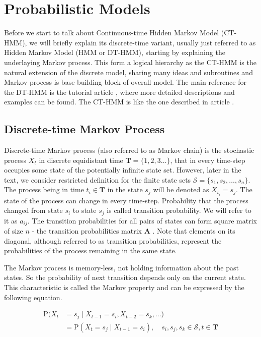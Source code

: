 \documentclass[thesis=M,english]{FITthesis}[2012/10/20]
\newcommand{\matr}[1]{\mathbf{#1}}
\begin{document}

\chapter{Probabilistic Models}\label{ch:pm}

Before we start to talk about Continuous-time Hidden Markov Model (CT-HMM), we will briefly explain its discrete-time variant, usually just referred to as Hidden Markov Model (HMM or DT-HMM), starting by explaining the underlaying Markov process. This form a logical hierarchy as the CT-HMM is the natural extension of the discrete model, sharing many ideas and subroutines and Markov process is base building block of overall model. The main reference for the DT-HMM is the tutorial article \cite{Ra89}, where more detailed descriptions and examples can be found. The CT-HMM is like the one described in article \cite{Li15}.

\section{Discrete-time Markov Process}\label{sec:DMP}
    
Discrete-time Markov process (also referred to as Markov chain) \cite{Gr01} is the stochastic process $X_t$ in discrete equidistant time $\matr{T} = \{ 1, 2, 3 \dots \}$, that in every time-step occupies some state of the potentially infinite state set. However, later in the text, we consider restricted definition for the finite state sets $\mathcal{S} = \{ s_1, s_2, \dots, s_n\}$.  The process being in time $t_i \in \matr{T}$ in the state $s_j$ will be denoted as $X_{t_i} = s_j$. The state of the process can change in every time-step. Probability that the process changed from state $s_i$ to state $s_j$ is called transition probability. We will refer to it as $a_{ij}$. The transition probabilities for all pairs of states can form square matrix of size $n$ - the transition probabilities matrix $\matr{A}$ . Note that elements on its diagonal, although referred to as transition probabilities, represent the probabilities of the process remaining in the same state.

The Markov process is memory-less, not holding information about the past states. So the probability of next transition depends only on the current state. This characteristic is called the Markov property and can be expressed by the following equation.

\begin{equation}\label{eq:mp}
\begin{aligned}
\mathrm{P}(X_t & = s_j \mid X_{t-1} = s_i, X_{t-2} = s_k, \dots)  \\   
               & = \mathrm{P}(X_t = s_j \mid X_{t-1} = s_i ), \quad s_i,s_j,s_k \in \mathcal{S}, t \in \matr{T}
\end{aligned}
\end{equation}
\end{document}
